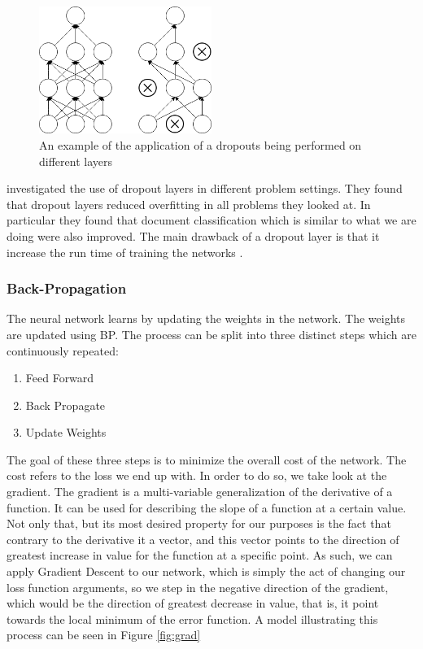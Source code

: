 \begin{description}
        \begin{figure}
        \centering
        \includegraphics[width=0.5\textwidth]{./pictures/method/Dropout.png}
        \caption{An example of the application of a dropouts being performed
            on different layers}
        \label{fig:dropout}
        \end{figure}

        \citet{JMLR:v15:srivastava14a} investigated the use of dropout layers
        in different problem settings. They found that dropout layers reduced
        overfitting in all problems they looked at. In particular they found
        that document classification which is similar to what we are doing were
        also improved. The main drawback of a dropout layer is that it increase
        the run time of training the networks \citep{JMLR:v15:srivastava14a}.

\end{description}


\subsubsection{Back-Propagation}\label{sec:BP}

The neural network learns by updating the weights in the network. The weights
are updated using \gls{BP}. The process can be split into three distinct steps
which are continuously repeated:

\begin{enumerate}
    \item Feed Forward
    \item Back Propagate
    \item Update Weights
\end{enumerate}

The goal of these three steps is to minimize the overall cost of the network.
The cost refers to the loss we end up with. In order to do so, we take look at
the gradient. The gradient is a multi-variable generalization of the derivative
of a function. It can be used for describing the slope of a function at a
certain value. Not only that, but its most desired property for our purposes is
the fact that contrary to the derivative it a vector, and this vector points
to the direction of greatest increase in value for the function at a specific
point. As such, we can apply Gradient Descent to our network, which is simply
the act of changing our loss function arguments, so we step in the negative
direction of the gradient, which would be the direction of greatest decrease
in value, that is, it point towards the local minimum of the error function. A
model illustrating this process can be seen in Figure \ref{fig:grad}

